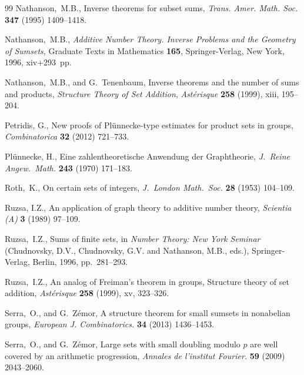 \documentclass[12pt,reqno]{amsart}
\theoremstyle{definition}
\begin{document}
\begin{thebibliography}{99}
Nathanson,~M.B., Inverse theorems for subset sums, {\em Trans. Amer. Math. Soc.} {\bf 347} (1995) 1409--1418.

Nathanson,~M.B.,
{\em Additive Number Theory.
  Inverse Problems and the Geometry of Sumsets}, Graduate Texts in Mathematics {\bf 165}, Springer-Verlag, New York,
1996, xiv+293~pp.

Nathanson,~M.B., and  G.~Tenenbaum, Inverse theorems and the number of sums and products,  {\em Structure Theory of Set Addition}, {\em Ast\'erisque} {\bf 258} (1999), xiii, 195--204.

Petridis, G., New proofs of Pl\"unnecke-type estimates for product sets in groups,
{\em Combinatorica} {\bf 32} (2012) 721--733.

Pl\"unnecke, H.,
Eine zahlentheoretische Anwendung der Graphtheorie,
{\em J.~Reine Angew.~Math.} {\bf 243} (1970) 171--183.

Roth,~K.,
On certain sets of integers,
{\em J.~London Math.~Soc.} {\bf 28} (1953) 104--109.

Ruzsa, I.Z.,
An application of graph theory to additive number theory,
{\em Scientia (A)} {\bf 3} (1989) 97--109.



Ruzsa,~I.Z.,
Sums of finite sets,
in {\em Number Theory: New York Seminar} (Chudnovsky, D.V., Chudnovsky, G.V. and Nathanson, M.B., eds.), Springer-Verlag, Berlin, 1996, pp.~281--293.

Ruzsa,~I.Z., An analog of Freiman's theorem in groups,
Structure theory of set addition, {\em Ast\'erisque} {\bf 258} (1999), xv, 323--326.

Serra,~O., and G.~Z\'emor,  A structure theorem for small sumsets in nonabelian groups, {\em European J. Combinatorics.} {\bf 34} (2013) 1436--1453.

Serra,~O., and G.~Z\'emor,  Large sets with small doubling modulo $p$ are well covered by an arithmetic progression, {\em Annales de l’institut Fourier.} {\bf 59} (2009) 2043--2060.



\end{thebibliography}
\end{document}
